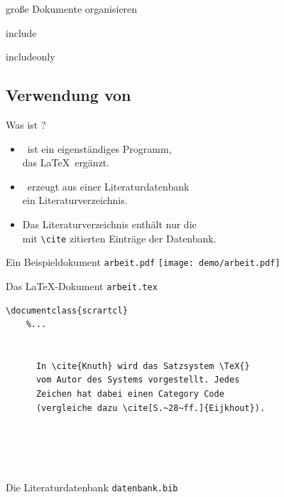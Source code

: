 \begin{Frame}
  große Dokumente organisieren

  include

  includeonly
\end{Frame}

\jonny


\subsection{Verwendung von \BibTeX}

\begin{Frame}[fragile]{Was ist \BibTeX?}
  \begin{itemize}
    \item \BibTeX\ ist ein \alert{eigenständiges Programm},\\
    das \LaTeX\ ergänzt.
    \item \BibTeX\ erzeugt aus einer \alert{Literaturdatenbank}\\
      ein \alert{Literaturverzeichnis}.
    \item Das Literaturverzeichnis enthält \alert{nur} die\\
      mit \lstinline-\cite- \alert{zitierten Einträge} der Datenbank.
  \end{itemize}
\end{Frame}

\begin{Frame}[t]{Ein Beispieldokument \texttt{arbeit.pdf}}
  \texttt{[image: demo/arbeit.pdf]}
\end{Frame}

\begin{Frame}[fragile]{Das \LaTeX-Dokument \texttt{arbeit.tex}}
  \begin{lstlisting}[gobble=4]
    \documentclass{scrartcl}
    %...

    
      In \cite{Knuth} wird das Satzsystem \TeX{}
      vom Autor des Systems vorgestellt. Jedes
      Zeichen hat dabei einen Category Code
      (vergleiche dazu \cite[S.~28~ff.]{Eijkhout}).

      
      
    
  \end{lstlisting}
\end{Frame}

\begin{Frame}{Die Literaturdatenbank \texttt{datenbank.bib}}
  
\end{Frame}

